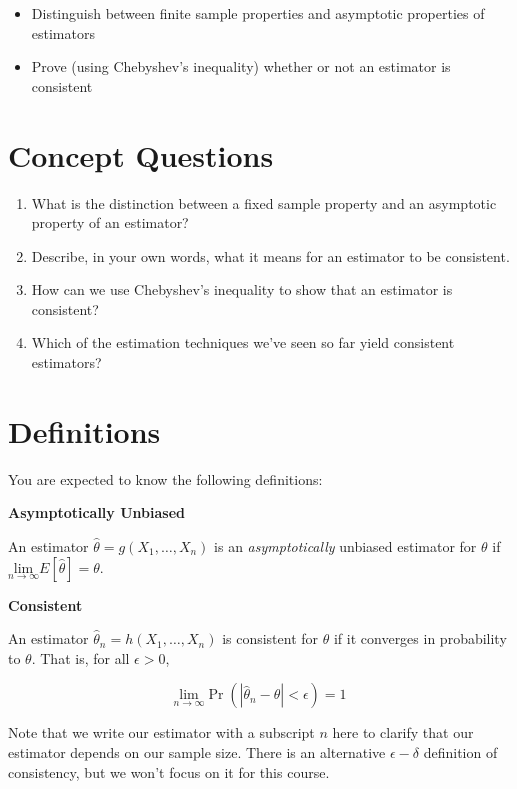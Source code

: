 \documentclass[
  letterpaper,
  DIV=11,
  numbers=noendperiod]{scrreprt}
\providecommand{\tightlist}{%
  \setlength{\itemsep}{0pt}\setlength{\parskip}{0pt}}\usepackage{longtable,booktabs,array}
\begin{document}
\begin{itemize}
\tightlist
\item
  Distinguish between finite sample properties and asymptotic properties
  of estimators
\item
  Prove (using Chebyshev's inequality) whether or not an estimator is
  consistent
\end{itemize}

\section{Concept Questions}\label{concept-questions-4}

\begin{enumerate}
\def\labelenumi{\arabic{enumi}.}
\item
  What is the distinction between a fixed sample property and an
  asymptotic property of an estimator?
\item
  Describe, in your own words, what it means for an estimator to be
  consistent.
\item
  How can we use Chebyshev's inequality to show that an estimator is
  consistent?
\item
  Which of the estimation techniques we've seen so far yield consistent
  estimators?
\end{enumerate}

\section{Definitions}\label{definitions-4}

You are expected to know the following definitions:

\textbf{Asymptotically Unbiased}

An estimator \(\hat{\theta} = g(X_1, \dots, X_n)\) is an
\emph{asymptotically} unbiased estimator for \(\theta\) if
\(\underset{n \to \infty}{\text{lim}} E[\hat{\theta}] = \theta\).

\textbf{Consistent}

An estimator \(\hat{\theta}_n = h(X_1, \dots, X_n)\) is consistent for
\(\theta\) if it converges in probability to \(\theta\). That is, for
all \(\epsilon > 0\),

\[
\underset{n \to \infty}{\text{lim}} \Pr(| \hat{\theta}_n - \theta | < \epsilon) = 1
\]

Note that we write our estimator with a subscript \(n\) here to clarify
that our estimator depends on our sample size. There is an alternative
\(\epsilon-\delta\) definition of consistency, but we won't focus on it
for this course.
\end{document}

